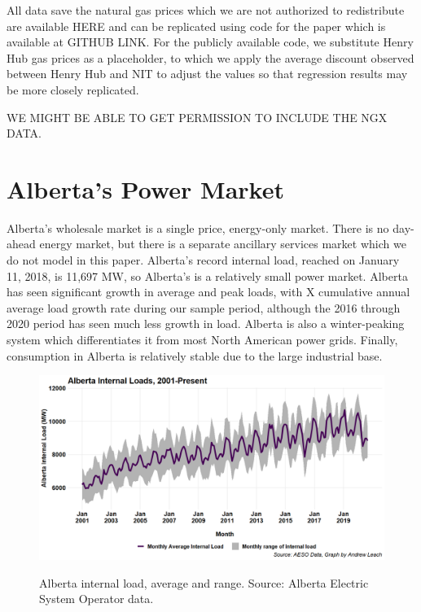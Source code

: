 \documentclass[12pt]{article}
\begin{document}
All data save the natural gas prices which we are not authorized to redistribute are available HERE and can be replicated using code for the paper which is available at GITHUB LINK. For the publicly available code, we substitute Henry Hub gas prices as a placeholder, to which we apply the average discount observed between Henry Hub and NIT to adjust the values so that regression results may be more closely replicated.

WE MIGHT BE ABLE TO GET PERMISSION TO INCLUDE THE NGX DATA.


\section{Alberta's Power Market}

Alberta's wholesale market is a single price, energy-only market. There is no day-ahead energy market, but there is a separate ancillary services market which we do not model in this paper. Alberta's record internal load, reached on January 11, 2018, is 11,697 MW, so Alberta's is a relatively small power market.  Alberta has seen significant growth in average and peak loads, with X cumulative annual average load growth rate during our sample period, although the 2016 through 2020 period has seen much less growth in load. Alberta is also a winter-peaking system which differentiates it from most North American power grids. Finally, consumption in Alberta is relatively stable due to the large industrial base.


\begin{figure}[!h]%
	\centering \vspace{-.25cm} \includegraphics[width=6.5in]{../images/load_time.png}
\label{fig:AB load}
\vspace{-0.75cm}	\caption{Alberta internal load, average and range.  Source: Alberta Electric System Operator data.}
\end{figure}
\end{document}
